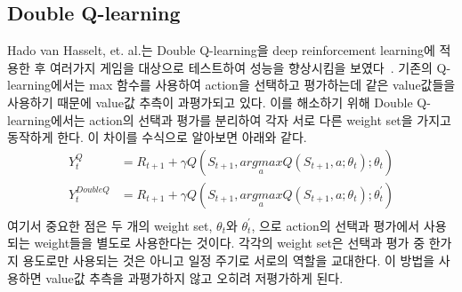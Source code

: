 \subsection{Double Q-learning}
Hado van Hasselt, et. al.는 Double Q-learning을 deep reinforcement learning에 적용한 후 여러가지 게임을 대상으로 테스트하여 성능을 향상시킴을 보였다~\cite{DoubleQ}.
기존의 Q-learning에서는 max 함수를 사용하여 action을 선택하고 평가하는데 같은 value값들을 사용하기 때문에 value값 추측이 과평가되고 있다.
이를 해소하기 위해 Double Q-learning에서는 action의 선택과 평가를 분리하여 각자 서로 다른 weight set을 가지고 동작하게 한다.
이 차이를 수식으로 알아보면 아래와 같다.
\begin{align*}
	Y^Q_t &= R_{t+1} + \gamma Q ( S_{t+1}, \underset{a}{argmax}Q(S_{t+1},a;\theta_t);\theta_t ) \\
	Y^{DoubleQ}_t &= R_{t+1} + \gamma Q ( S_{t+1}, \underset{a}{argmax}Q(S_{t+1},a;\theta_t);\theta^{'}_t ) \\
\end{align*}
여기서 중요한 점은 두 개의 weight set, $\theta_t$와 $\theta^{'}_t$, 으로 action의 선택과 평가에서 사용되는 weight들을 별도로 사용한다는 것이다.
각각의 weight set은 선택과 평가 중 한가지 용도로만 사용되는 것은 아니고 일정 주기로 서로의 역할을 교대한다.
이 방법을 사용하면 value값 추측을 과평가하지 않고 오히려 저평가하게 된다.
